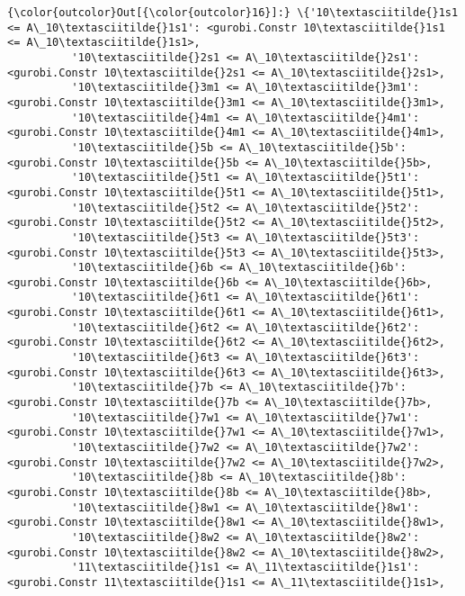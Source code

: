 \documentclass[11pt]{article}
\begin{document}
            \begin{Verbatim}[commandchars=\\\{\}]
{\color{outcolor}Out[{\color{outcolor}16}]:} \{'10\textasciitilde{}1s1 <= A\_10\textasciitilde{}1s1': <gurobi.Constr 10\textasciitilde{}1s1 <= A\_10\textasciitilde{}1s1>,
          '10\textasciitilde{}2s1 <= A\_10\textasciitilde{}2s1': <gurobi.Constr 10\textasciitilde{}2s1 <= A\_10\textasciitilde{}2s1>,
          '10\textasciitilde{}3m1 <= A\_10\textasciitilde{}3m1': <gurobi.Constr 10\textasciitilde{}3m1 <= A\_10\textasciitilde{}3m1>,
          '10\textasciitilde{}4m1 <= A\_10\textasciitilde{}4m1': <gurobi.Constr 10\textasciitilde{}4m1 <= A\_10\textasciitilde{}4m1>,
          '10\textasciitilde{}5b <= A\_10\textasciitilde{}5b': <gurobi.Constr 10\textasciitilde{}5b <= A\_10\textasciitilde{}5b>,
          '10\textasciitilde{}5t1 <= A\_10\textasciitilde{}5t1': <gurobi.Constr 10\textasciitilde{}5t1 <= A\_10\textasciitilde{}5t1>,
          '10\textasciitilde{}5t2 <= A\_10\textasciitilde{}5t2': <gurobi.Constr 10\textasciitilde{}5t2 <= A\_10\textasciitilde{}5t2>,
          '10\textasciitilde{}5t3 <= A\_10\textasciitilde{}5t3': <gurobi.Constr 10\textasciitilde{}5t3 <= A\_10\textasciitilde{}5t3>,
          '10\textasciitilde{}6b <= A\_10\textasciitilde{}6b': <gurobi.Constr 10\textasciitilde{}6b <= A\_10\textasciitilde{}6b>,
          '10\textasciitilde{}6t1 <= A\_10\textasciitilde{}6t1': <gurobi.Constr 10\textasciitilde{}6t1 <= A\_10\textasciitilde{}6t1>,
          '10\textasciitilde{}6t2 <= A\_10\textasciitilde{}6t2': <gurobi.Constr 10\textasciitilde{}6t2 <= A\_10\textasciitilde{}6t2>,
          '10\textasciitilde{}6t3 <= A\_10\textasciitilde{}6t3': <gurobi.Constr 10\textasciitilde{}6t3 <= A\_10\textasciitilde{}6t3>,
          '10\textasciitilde{}7b <= A\_10\textasciitilde{}7b': <gurobi.Constr 10\textasciitilde{}7b <= A\_10\textasciitilde{}7b>,
          '10\textasciitilde{}7w1 <= A\_10\textasciitilde{}7w1': <gurobi.Constr 10\textasciitilde{}7w1 <= A\_10\textasciitilde{}7w1>,
          '10\textasciitilde{}7w2 <= A\_10\textasciitilde{}7w2': <gurobi.Constr 10\textasciitilde{}7w2 <= A\_10\textasciitilde{}7w2>,
          '10\textasciitilde{}8b <= A\_10\textasciitilde{}8b': <gurobi.Constr 10\textasciitilde{}8b <= A\_10\textasciitilde{}8b>,
          '10\textasciitilde{}8w1 <= A\_10\textasciitilde{}8w1': <gurobi.Constr 10\textasciitilde{}8w1 <= A\_10\textasciitilde{}8w1>,
          '10\textasciitilde{}8w2 <= A\_10\textasciitilde{}8w2': <gurobi.Constr 10\textasciitilde{}8w2 <= A\_10\textasciitilde{}8w2>,
          '11\textasciitilde{}1s1 <= A\_11\textasciitilde{}1s1': <gurobi.Constr 11\textasciitilde{}1s1 <= A\_11\textasciitilde{}1s1>,

\end{Verbatim}
\end{document}
